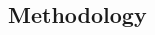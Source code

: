 \documentclass[10pt]{article}
\begin{document}
\begin{multicols*}{2}
\section{Methodology}

%
%
%	

\end{multicols*}

\clearpage



	
\end{document}
